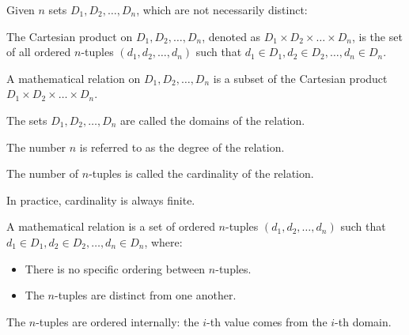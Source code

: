 Given $n$ sets $D_1, D_2, \dots, D_n$, which are not necessarily distinct:
\begin{definition}
    The Cartesian product on $D_1, D_2, \dots, D_n$, denoted as $D_1 \times D_2 \times \dots \times D_n$, is the set of all ordered $n$-tuples $(d_1, d_2, \dots, d_n)$ such that $d_1 \in D_1, d_2 \in D_2, \dots, d_n \in D_n$. 
\end{definition}
\begin{definition}
    A mathematical relation on $D_1, D_2, \dots, D_n$ is a subset of the Cartesian product $D_1 \times D_2 \times \dots \times D_n$. 
\end{definition}
\begin{definition}
    The sets $D_1, D_2, \dots, D_n$ are called the domains of the relation.
\end{definition}
\begin{definition}
    The number $n$ is referred to as the degree of the relation.
\end{definition}
\begin{definition}
    The number of $n$-tuples is called the cardinality of the relation.
\end{definition}
In practice, cardinality is always finite.
\begin{definition}
    A mathematical relation is a set of ordered $n$-tuples $(d_1, d_2, \dots, d_n)$ such that $d_1 \in D_1, d_2 \in D_2, \dots, d_n \in D_n$, where:
    \begin{itemize}
        \item There is no specific ordering between $n$-tuples.
        \item The $n$-tuples are distinct from one another.
    \end{itemize}
\end{definition}
The $n$-tuples are ordered internally: the $i$-th value comes from the $i$-th domain.
